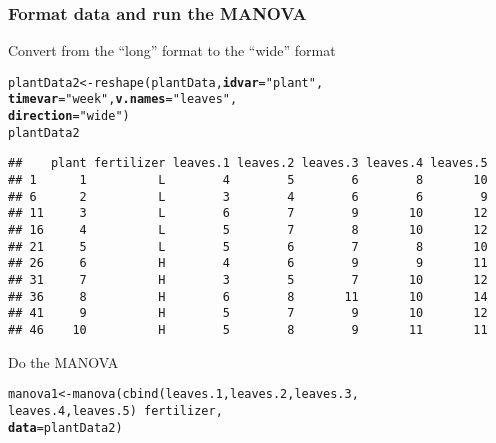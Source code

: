 \documentclass[color=usenames,dvipsnames]{beamer}\usepackage[]{graphicx}\usepackage[]{color}
\makeatletter
\newcommand{\hlstr}[1]{\textcolor[rgb]{0.749,0.012,0.012}{#1}}%
\newcommand{\hlopt}[1]{\textcolor[rgb]{0,0,0}{#1}}%
\newcommand{\hlstd}[1]{\textcolor[rgb]{0,0,0}{#1}}%
\newcommand{\hlkwb}[1]{\textcolor[rgb]{0,0.341,0.682}{#1}}%
\newcommand{\hlkwc}[1]{\textcolor[rgb]{0,0,0}{\textbf{#1}}}%
\newcommand{\hlkwd}[1]{\textcolor[rgb]{0.004,0.004,0.506}{#1}}%
\newenvironment{kframe}{%
 \def\at@end@of@kframe{}%
 \ifinner\ifhmode%
  \def\at@end@of@kframe{\end{minipage}}%
  \begin{minipage}{\columnwidth}%
 \fi\fi%
 \def\FrameCommand##1{\hskip\@totalleftmargin \hskip-\fboxsep
 \colorbox{shadecolor}{##1}\hskip-\fboxsep
     \hskip-\linewidth \hskip-\@totalleftmargin \hskip\columnwidth}%
 \MakeFramed {\advance\hsize-\width
   \@totalleftmargin\z@ \linewidth\hsize
   \@setminipage}}%
 {\par\unskip\endMakeFramed%
 \at@end@of@kframe}
\newenvironment{knitrout}{}{} %
\makeatother
\begin{document}
\begin{frame}[fragile]
  \frametitle{Format data and run the MANOVA}
  Convert from the ``long'' format to the ``wide'' format %
\begin{knitrout}\scriptsize
{}\color{fgcolor}\begin{kframe}
\begin{alltt}
\hlstd{plantData2} \hlkwb{<-} \hlkwd{reshape}\hlstd{(plantData,} \hlkwc{idvar}\hlstd{=}\hlstr{"plant"}\hlstd{,}
                      \hlkwc{timevar}\hlstd{=}\hlstr{"week"}\hlstd{,} \hlkwc{v.names}\hlstd{=}\hlstr{"leaves"}\hlstd{,}
                      \hlkwc{direction}\hlstd{=}\hlstr{"wide"}\hlstd{)}
\hlstd{plantData2}
\end{alltt}
\begin{verbatim}
##    plant fertilizer leaves.1 leaves.2 leaves.3 leaves.4 leaves.5
## 1      1          L        4        5        6        8       10
## 6      2          L        3        4        6        6        9
## 11     3          L        6        7        9       10       12
## 16     4          L        5        7        8       10       12
## 21     5          L        5        6        7        8       10
## 26     6          H        4        6        9        9       11
## 31     7          H        3        5        7       10       12
## 36     8          H        6        8       11       10       14
## 41     9          H        5        7        9       10       12
## 46    10          H        5        8        9       11       11
\end{verbatim}
\end{kframe}
\end{knitrout}
\pause
Do the MANOVA
\begin{knitrout}\scriptsize
{}\color{fgcolor}\begin{kframe}
\begin{alltt}
\hlstd{manova1} \hlkwb{<-} \hlkwd{manova}\hlstd{(}\hlkwd{cbind}\hlstd{(leaves.1, leaves.2, leaves.3,}
                        \hlstd{leaves.4, leaves.5)} \hlopt{~} \hlstd{fertilizer,}
                  \hlkwc{data}\hlstd{=plantData2)}
\end{alltt}
\end{kframe}
\end{knitrout}
\end{frame}
\end{document}

